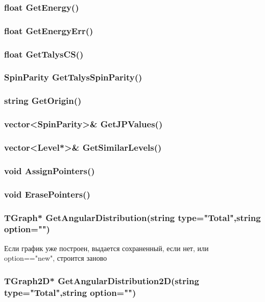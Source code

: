 \documentclass[a4paper,12pt]{extarticle}
\begin{document}
\subsubsection{float GetEnergy()} 

\subsubsection{float GetEnergyErr()}

\subsubsection{float GetTalysCS()} 

\subsubsection{SpinParity GetTalysSpinParity()}

\subsubsection{string GetOrigin()} 

\subsubsection{vector<SpinParity>\textbf{\&} GetJPValues()}

\subsubsection{vector<Level*>\textbf{\&} GetSimilarLevels()}

\subsubsection{void AssignPointers()}

\subsubsection{void ErasePointers()}

\subsubsection{TGraph* GetAngularDistribution(string type="Total",string option="")}
Если график уже построен, выдается сохраненный, если нет, или option=="new", строится заново
\subsubsection{TGraph2D* GetAngularDistribution2D(string type="Total",string option="")}
\end{document}
